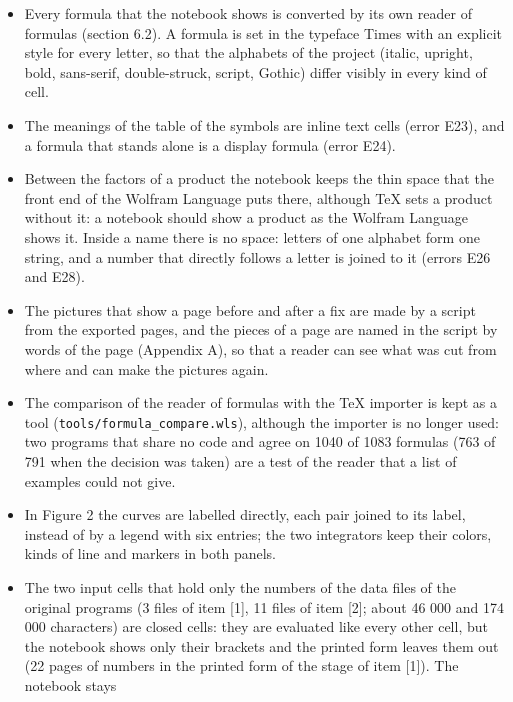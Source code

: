 \documentclass[
  10pt,
]{article}
\begin{document}
\begin{itemize}
  Runge-Kutta step, its part of the data cell, its check and its figure
  were removed with the method itself (error E20); nothing of the
  removed method is kept in the notebook.
\item
  Every formula that the notebook shows is converted by its own reader
  of formulas (section 6.2). A formula is set in the typeface Times with
  an explicit style for every letter, so that the alphabets of the
  project (italic, upright, bold, sans-serif, double-struck, script,
  Gothic) differ visibly in every kind of cell.
\item
  The meanings of the table of the symbols are inline text cells (error
  E23), and a formula that stands alone is a display formula (error
  E24).
\item
  Between the factors of a product the notebook keeps the thin space
  that the front end of the Wolfram Language puts there, although TeX
  sets a product without it: a notebook should show a product as the
  Wolfram Language shows it. Inside a name there is no space: letters of
  one alphabet form one string, and a number that directly follows a
  letter is joined to it (errors E26 and E28).
\item
  The pictures that show a page before and after a fix are made by a
  script from the exported pages, and the pieces of a page are named in
  the script by words of the page (Appendix A), so that a reader can see
  what was cut from where and can make the pictures again.
\item
  The comparison of the reader of formulas with the TeX importer is kept
  as a tool (\texttt{tools/formula\_compare.wls}), although the importer
  is no longer used: two programs that share no code and agree on 1040
  of 1083 formulas (763 of 791 when the decision was taken) are a test
  of the reader that a list of examples could not give.
\item
  In Figure 2 the curves are labelled directly, each pair joined to its
  label, instead of by a legend with six entries; the two integrators
  keep their colors, kinds of line and markers in both panels.
\item
  The two input cells that hold only the numbers of the data files of
  the original programs (3 files of item {[}1{]}, 11 files of item
  {[}2{]}; about 46 000 and 174 000 characters) are closed cells: they
  are evaluated like every other cell, but the notebook shows only their
  brackets and the printed form leaves them out (22 pages of numbers in
  the printed form of the stage of item {[}1{]}). The notebook stays

\end{itemize}
\end{document}
